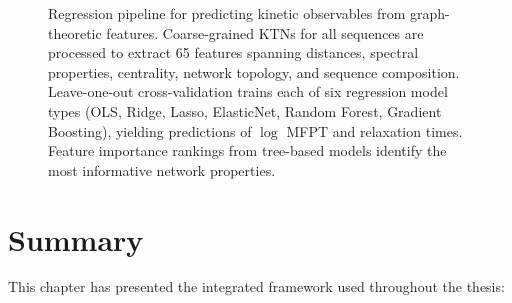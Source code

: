 \begin{figure}[ht]
\begin{tikzpicture}
  \end{tikzpicture}
  \caption{Regression pipeline for predicting kinetic observables from graph-theoretic features. Coarse-grained KTNs for all sequences are processed to extract 65 features spanning distances, spectral properties, centrality, network topology, and sequence composition. Leave-one-out cross-validation trains each of six regression model types (OLS, Ridge, Lasso, ElasticNet, Random Forest, Gradient Boosting), yielding predictions of $\log$ MFPT and relaxation times. Feature importance rankings from tree-based models identify the most informative network properties.}
  \label{fig:regression-pipeline}
\end{figure}



\section{Summary}\label{sec:methods-summary}

This chapter has presented the integrated framework used throughout the thesis:

